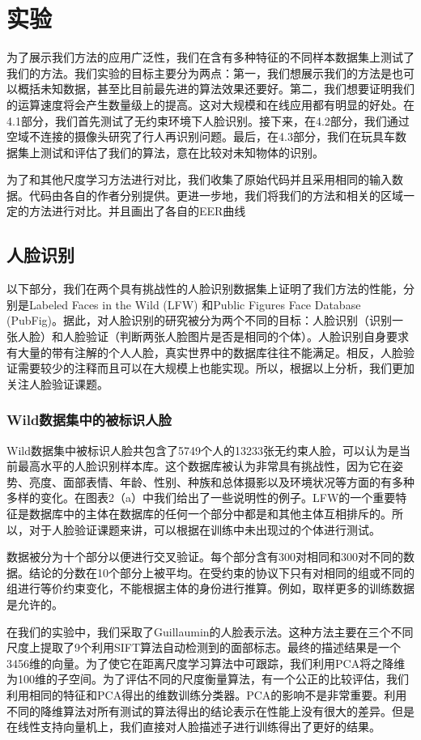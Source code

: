 \section{实验}
为了展示我们方法的应用广泛性，我们在含有多种特征的不同样本数据集上测试了我们的方法。我们实验的目标主要分为两点：第一，我们想展示我们的方法是也可以概括未知数据，甚至比目前最先进的算法效果还要好。第二，我们想要证明我们的运算速度将会产生数量级上的提高。这对大规模和在线应用都有明显的好处。在4.1部分，我们首先测试了无约束环境下人脸识别。接下来，在4.2部分，我们通过空域不连接的摄像头研究了行人再识别问题。最后，在4.3部分，我们在玩具车数据集上测试和评估了我们的算法，意在比较对未知物体的识别。

为了和其他尺度学习方法进行对比，我们收集了原始代码并且采用相同的输入数据。代码由各自的作者分别提供。更进一步地，我们将我们的方法和相关的区域一定的方法进行对比。并且画出了各自的EER曲线
\subsection{人脸识别}
以下部分，我们在两个具有挑战性的人脸识别数据集上证明了我们方法的性能，分别是Labeled Faces in the Wild (LFW)\cite{huang2008labeled} 和Public Figures Face Database (PubFig)\cite{kumar2009attribute}。据此，对人脸识别的研究被分为两个不同的目标：人脸识别（识别一张人脸）和人脸验证（判断两张人脸图片是否是相同的个体）。人脸识别自身要求有大量的带有注解的个人人脸，真实世界中的数据库往往不能满足。相反，人脸验证需要较少的注释而且可以在大规模上也能实现。所以，根据以上分析，我们更加关注人脸验证课题。

\subsubsection{Wild数据集中的被标识人脸}
Wild数据集\cite{huang2008labeled}中被标识人脸共包含了5749个人的13233张无约束人脸，可以认为是当前最高水平的人脸识别样本库。这个数据库被认为非常具有挑战性，因为它在姿势、亮度、面部表情、年龄、性别、种族和总体摄影以及环境状况等方面的有多种多样的变化。在图表2（a）中我们给出了一些说明性的例子。LFW的一个重要特征是数据库中的主体在数据库的任何一个部分中都是和其他主体互相排斥的。所以，对于人脸验证课题来讲，可以根据在训练中未出现过的个体进行测试。

数据被分为十个部分以便进行交叉验证。每个部分含有300对相同和300对不同的数据。结论的分数在10个部分上被平均。在受约束的协议下只有对相同的组或不同的组进行等价约束变化，不能根据主体的身份进行推算。例如，取样更多的训练数据是允许的。

在我们的实验中，我们采取了Guillaumin\cite{guillaumin2009you}的人脸表示法。这种方法主要在三个不同尺度上提取了9个利用SIFT算法\cite{lowe2004distinctive}自动检测到的面部标志。最终的描述结果是一个3456维的向量。为了使它在距离尺度学习算法中可跟踪，我们利用PCA将之降维为100维的子空间。为了评估不同的尺度衡量算法，有一个公正的比较评估，我们利用相同的特征和PCA得出的维数训练分类器。PCA的影响不是非常重要。利用不同的降维算法对所有测试的算法得出的结论表示在性能上没有很大的差异。但是在线性支持向量机上，我们直接对人脸描述子进行训练得出了更好的结果。

